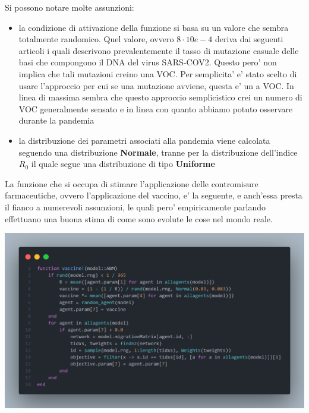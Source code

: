 Si possono notare molte assunzioni:
\begin{itemize}
	\item la condizione di attivazione della funzione si basa su un valore
	che sembra totalmente randomico. Quel valore, ovvero $8 \cdot 10e-4$ deriva dai
	seguenti articoli \cite{Markov2023} \cite{https://doi.org/10.1002/jmv.27331} \cite{Abavisani2022}
	i quali descrivono prevalentemente il tasso di mutazione casuale delle basi che compongono
	il DNA del virus SARS-COV2. Questo pero' non implica che tali mutazioni 
	creino una VOC. Per semplicita' e' stato scelto di usare l'approccio per cui
	se una mutazione avviene, questa e' un a VOC. In linea di massima sembra che 
	questo approccio semplicistico crei un numero di VOC generalmente sensato e 
	in linea con quanto abbiamo potuto osservare durante la pandemia
	\item la distribuzione dei parametri associati alla pandemia viene calcolata
	seguendo una distribuzione \textbf{Normale}, tranne per la distribuzione dell'indice $R_0$
	il quale segue una distribuzione di tipo \textbf{Uniforme} \cite{wiki:Numero_di_riproduzione_di_base}
\end{itemize}

La funzione che si occupa di stimare l'applicazione delle contromisure farmaceutiche, ovvero l'applicazione del vaccino,
e' la seguente, e anch'essa presta il fianco a numerevoli assunzioni, le quali pero' empiricamente parlando
effettuano una buona stima di come sono evolute le cose nel mondo reale.

\begin{minipage}{\linewidth}
	\centering
	\includegraphics[width=\textwidth]{img/vaccine.png}
	\label{fig:vaccine}
\end{minipage}

